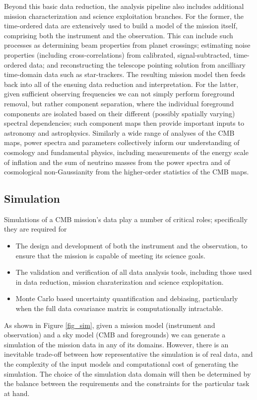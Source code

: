 Beyond this basic data reduction, the analysis pipeline also includes additional mission characterization and science exploitation branches. For the former, the time-ordered data are extensively used to build a model of the mission itself, comprising both the instrument and the observation. This can include such processes as determining beam properties from planet crossings; estimating noise properties (including cross-correlations) from calibrated, signal-subtracted, time-ordered data; and reconstructing the telescope pointing solution from ancilliary time-domain data such as star-trackers. The resulting mission model then feeds back into all of the ensuing data reduction and interpretation. For the latter, given sufficient observing frequencies we can not simply perform foreground removal, but rather component separation, where the individual foreground components are isolated based on their different (possibly spatially varying) spectral dependencies; such component maps then provide important inputs to astronomy and astrophysics. Similarly a wide range of analyses of the CMB maps, power spectra and parameters collectively inform our understanding of cosmology and fundamental physics, including measurements of the energy scale of inflation and the sum of neutrino masses from the power spectra and of cosmological non-Gaussianity from the higher-order statistics of the CMB maps.

\subsection{Simulation}

Simulations of a CMB mission's data play a number of critical roles; specifically they are required for
\begin{itemize}
\item The design and development of both the instrument and the observation, to ensure that the mission is capable of meeting its science goals.
\item The validation and verification of all data analysis tools, including those used in data reduction, mission charaterization and science explopitation.
\item Monte Carlo based uncertainty quantification and debiasing, particularly when the full data covariance matrix is computationally intractable.
\end{itemize}

As shown in Figure \ref{fig_sim}, given a mission model (instrument and observation) and a sky model (CMB and foregrounds) we can generate a simulation of the mission data in any of its domains. However, there is an inevitable trade-off between how representative the simulation is of real data, and the complexity of the input models and computational cost of generating the simulation. The choice of the simulation data domain will then be determined by the balance between the requirements and the constraints for the particular task at hand.


